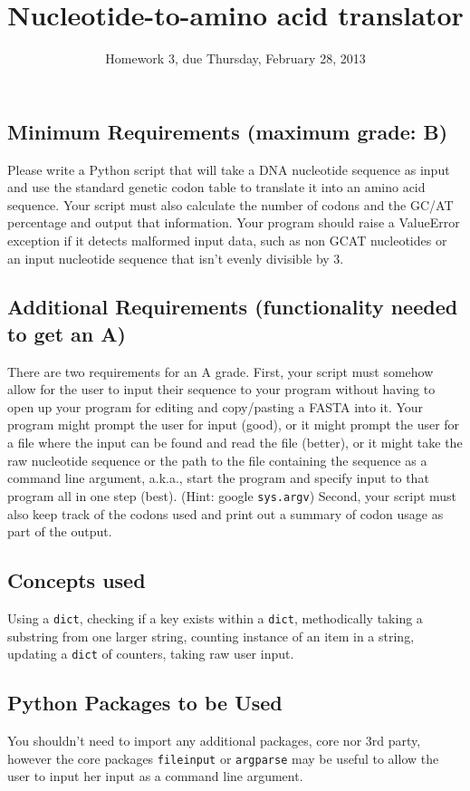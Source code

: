 \documentclass[11pt]{amsart}
\title{Nucleotide-to-amino acid translator}
\author{Homework 3, due Thursday, February 28, 2013}
\begin{document}
\maketitle

\subsection*{Minimum Requirements (maximum grade: B)}
Please write a Python script that will take a DNA nucleotide sequence as input and use the standard genetic codon table to translate it into an amino acid sequence. Your script must also calculate the number of codons and the GC/AT percentage and output that information. Your program should raise a ValueError exception if it detects malformed input data, such as non GCAT nucleotides or an input nucleotide sequence that isn't evenly divisible by 3.

\subsection*{Additional Requirements (functionality needed to get an A)}
There are two requirements for an A grade. First, your script must somehow allow for the user to input their sequence to your program without having to open up your program for editing and copy/pasting a FASTA into it. Your program might prompt the user for input (good), or it might prompt the user for a file where the input can be found and read the file (better), or it might take the raw nucleotide sequence or the path to the file containing the sequence as a command line argument, a.k.a., start the program and specify input to that program all in one step (best). (Hint: google \texttt{sys.argv}) Second, your script must also keep track of the codons used and print out a summary of codon usage as part of the output. 

\subsection*{Concepts used}
Using a \texttt{dict}, checking if a key exists within a \texttt{dict}, methodically taking a substring from one larger string, counting instance of an item in a string, updating a \texttt{dict} of counters, taking raw user input.

\subsection*{Python Packages to be Used}
You shouldn't need to import any additional packages, core nor 3rd party, however the core packages \texttt{fileinput} or \texttt{argparse} may be useful to allow the user to input her input as a command line argument. 
\end{document}
